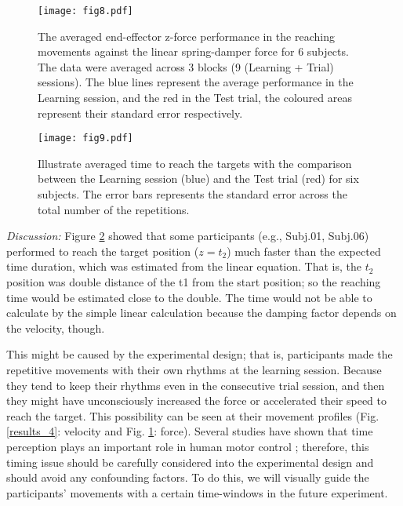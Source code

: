 \begin{figure}
	\centering
	\texttt{[image: fig8.pdf]}
	\caption{The averaged end-effector z-force performance in the reaching movements against the linear spring-damper force for 6 subjects. The data were averaged across 3 blocks (9 (Learning + Trial) sessions). The blue lines represent the average performance in the Learning session, and the red in the Test trial, the coloured areas represent their standard error respectively.}
	\label{results_5}
\end{figure}

\begin{figure}
	\centering
	\texttt{[image: fig9.pdf]}
	\caption{Illustrate averaged time to reach the targets with the comparison between the Learning session (blue) and the Test trial (red) for six	subjects. The error bars represents the standard error across the total number of the repetitions.}
	\label{results_6}
\end{figure}



\textit{Discussion:} Figure \ref{results_6} showed that some participants (e.g., Subj.01, Subj.06) performed to reach the target position ($z = t_2$) much faster than the expected time duration, which was estimated from the linear equation. That is, the $t_2$ position was double distance of the t1 from the start position; so the reaching time would be estimated close to the double. The time would not be able to calculate by the simple linear calculation because the damping factor depends on the velocity, though.

This might be caused by the experimental design; that is, participants made the repetitive movements with their own rhythms at the learning session. Because they tend to keep their rhythms even in the consecutive trial session, and then they might have unconsciously increased the force or accelerated their speed to reach the target. This possibility can be seen at their movement profiles (Fig. \ref{results_4}: velocity and Fig. \ref{results_5}: force). Several studies have shown that time perception plays an important role in human motor control \cite{Berret&Jean16, Rank&DiLuca15}; therefore, this timing issue should be carefully considered into the experimental design and should avoid any confounding factors. To do this, we will visually guide the participants' movements with a certain time-windows in the future experiment.

